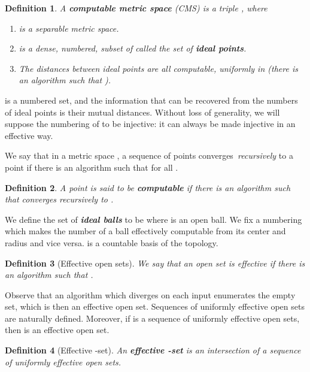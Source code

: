 \documentclass[copyright,creativecommons]{eptcs}
\newtheorem{definition}{Definition}
\numberwithin{equation}{section}
\begin{document}
\begin{definition}
A \textbf{\emph{computable metric space}} (CMS) is a triple , where

\begin{enumerate}
\item[(i)]  is a separable metric space.

\item[(ii)]  is a dense, numbered, subset of  called the set of \textbf{\emph{ideal points}}.

\item[(iii)] The distances between ideal points  are all
computable, uniformly in  (there is an algorithm  such that ).
\end{enumerate}
\end{definition}

 is a numbered set, and the information that can be recovered from the
numbers of ideal points is their mutual distances. Without loss of
generality, we will suppose the numbering of  to be injective: it can
always be made injective in an effective way.

We say that in a metric space , a sequence of points  converges\emph{\ recursively }to a point  if there is an
algorithm  such that 
for all .

\begin{definition}
\label{comp_points}A point  is said to be \textbf{\emph{computable}}
if there is an algorithm  such that  converges recursively to .
\end{definition}

We define the set of \textbf{\emph{ideal balls}} to be  where  is an open ball. We fix a numbering  which makes the number of a ball effectively
computable from its center and radius and vice versa.  is a
countable basis of the topology.

\begin{definition}[Effective open sets]
\label{reop} We say that an open set  is \emph{effective} if there is an
algorithm  such that .
\end{definition}

Observe that an algorithm which diverges on each input  enumerates the
empty set, which is then an effective open set. Sequences of uniformly
effective open sets are naturally defined. Moreover, if  is a sequence of uniformly effective open sets, then  is an effective open set.

\begin{definition}[Effective -set]
An \textbf{\emph{effective -set}} is an
intersection of a sequence of uniformly effective open sets.
\end{definition}
\end{document}
